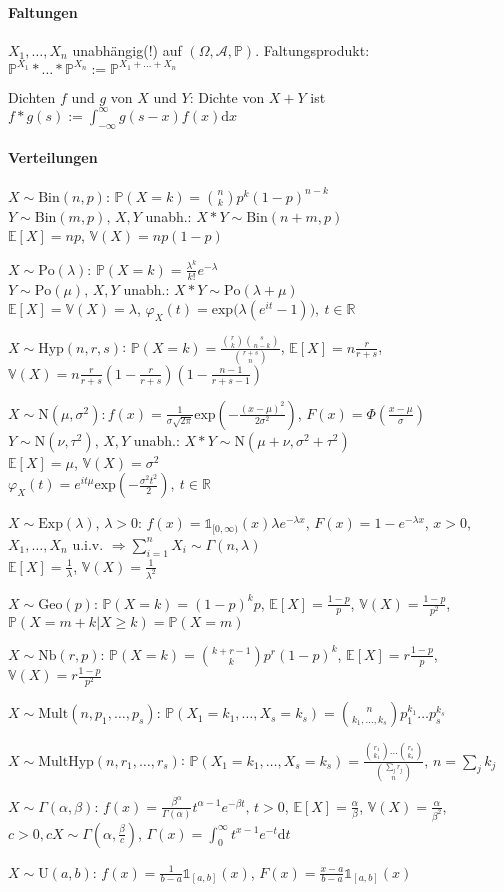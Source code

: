\documentclass[a4paper,draft]{article}
\newcommand{\R}{\mathds{R}}
\newcommand{\one}{\mathds{1}}
\newcommand{\A}{\mathcal{A}}
\renewcommand{\P}{\mathds{P}}
\newcommand{\E}[1]{\mathds{E}[#1]}
\renewcommand{\d}{\mathrm{d}}
\newcommand{\V}{\mathds{V}}
\newcommand{\parh}{\par\hangindent=0.5cm}
\renewcommand{\wr}{(\Omega,\A,\P)}
\begin{document}
\begin{multicols}{2}
\paragraph{Faltungen}\hspace{0pt}\parh
$X_1,\dots,X_n$ unabhängig{\color{red}(!)} auf $\wr$. Faltungsprodukt:\\
$\P^{X_1}\ast\dots\ast\P^{X_n} := \P^{X_1+\dots+X_n}$\parh
Dichten $f$ und $g$ von $X$ und $Y$: Dichte von $X+Y$ ist $f\ast g(s):=\int_{-\infty}^\infty g(s-x)f(x)\d x$

\paragraph{Verteilungen}\hspace{0pt}\parh
$X \sim \mathrm{Bin}(n,p)$: $\P(X=k)=\binom{n}{k}p^k(1-p)^{n-k}$\\
$Y\sim \mathrm{Bin}(m,p),\, X,Y$ unabh.: $X \ast Y \sim \mathrm{Bin}(n+m,p)$\\
$\E{X}=np$, $\V(X)=np(1-p)$\parh
$X \sim \mathrm{Po}(\lambda)$: $\P(X=k)=\frac{\lambda^k}{k!}e^{-\lambda}$\\
$Y\sim\mathrm{Po}(\mu),\, X,Y$ unabh.: $X \ast Y \sim \mathrm{Po}(\lambda+\mu)$\\
$\E{X}=\V(X)=\lambda$, $\varphi_X(t)=\mathrm{exp}\big(\lambda(e^{it}-1)\big),\:t\in\R$\parh
$X\sim\mathrm{Hyp}(n,r,s)$: $\P(X=k)=\frac{\binom{r}{k}\binom{s}{n-k}}{\binom{r+s}{n}}$, $\E{X}=n\frac{r}{r+s}$, $\V(X)=n\frac{r}{r+s}(1-\frac{r}{r+s})(1-\frac{n-1}{r+s-1})$\parh
$X \sim \mathrm{N}(\mu,\sigma^2): f(x)=\frac{1}{\sigma\sqrt{2\pi}}\mathrm{exp}\left(-\frac{(x-\mu)^2}{2\sigma^2}\right)$, $F(x)=\Phi\left(\frac{x-\mu}{\sigma}\right)$\\
$Y\sim\mathrm{N}(\nu,\tau^2),\, X,Y$ unabh.: $X \ast Y\sim \mathrm{N}(\mu+\nu,\sigma^2+\tau^2)$\\
$\E{X}=\mu$, $\V(X)=\sigma^2$\\
$\varphi_X(t)=e^{it\mu}\mathrm{exp}\left(-\frac{\sigma^2t^2}{2}\right),\:t\in\R$\parh
$X \sim \mathrm{Exp}(\lambda)$, $\lambda > 0$: $f(x)=\one_{[0,\infty)}(x)\lambda e^{-\lambda x}$, $F(x)=1-e^{-\lambda x}$, $x>0$, $X_1,\dots,X_n$ u.i.v. $\Rightarrow \sum_{i=1}^n X_i \sim  \Gamma(n,\lambda)$\\
$\E{X}=\frac{1}{\lambda}$, $\V(X)=\frac{1}{\lambda^2}$\parh
$X\sim\mathrm{Geo}(p)$: $\P(X=k)=(1-p)^kp$, $\E{X}=\frac{1-p}{p}$, $\V(X)=\frac{1-p}{p^2}$, $\P(X=m+k|X\geq k)=\P(X=m)$\parh
$X\sim\mathrm{Nb}(r,p)$: $\P(X=k)=\binom{k+r-1}{k}p^r(1-p)^k$, $\E{X}=r\frac{1-p}{p}$, $\V(X)=r\frac{1-p}{p^2}$\parh
$X\sim\mathrm{Mult}(n,p_1,\dots,p_s)$: $\P(X_1=k_1,\dots,X_s=k_s)=\binom{n}{k_1,\dots,k_s}p_1^{k_1}\hdots p_s^{k_s}$\parh
$X\sim\mathrm{MultHyp}(n,r_1,\dots,r_s)$: $\P(X_1=k_1,\dots,X_s=k_s)=\frac{\binom{r_1}{k_1}\hdots\binom{r_s}{k_s}}{\binom{\sum_j r_j}{n}},\,n=\sum_j k_j$\parh
$X\sim\Gamma(\alpha,\beta)$: $f(x)=\frac{\beta^\alpha}{\Gamma(\alpha)}t^{\alpha-1}e^{-\beta t},\,t>0$, $\E{X}=\frac{\alpha}{\beta}$, $\V(X)=\frac{\alpha}{\beta^2}$, $c>0, cX \sim \Gamma(\alpha,\frac{\beta}{c})$, $\Gamma(x)=\int_0^\infty t^{x-1}e^{-t}\d t$\parh
$X\sim\mathrm{U}(a,b)$: $f(x)=\frac{1}{b-a}\one_{[a,b]}(x)$, $F(x)=\frac{x-a}{b-a}\one_{[a,b]}(x)$


\end{multicols}
\end{document}
